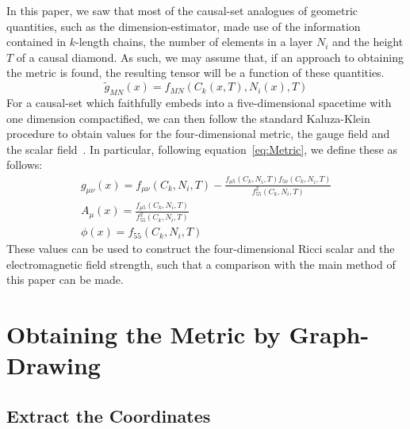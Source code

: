 \documentclass[a4paper,12pt]{article}
\numberwithin{equation}{section}
\begin{document}
In this paper, we saw that most of the causal-set analogues of geometric quantities, such as the dimension-estimator, made use of the information contained in $k$-length chains, the number of elements in a layer $N_i$ and the height $T$ of a causal diamond. As such, we may assume that, if an approach to obtaining the metric is found, the resulting tensor will be a function of these quantities.
\begin{equation}
\label{eq:Metric as a function}
\tilde{g}_{MN}(x)=f_{MN}(C_k(x, T), N_i(x), T)
\end{equation}
For a causal-set which faithfully embeds into a five-dimensional spacetime with one dimension compactified, we can then follow the standard Kaluza-Klein procedure to obtain values for the four-dimensional metric, the gauge field and the scalar field~\cite{Bailin1987}. In particular, following equation~\ref{eq:Metric}, we define these as follows:
\begin{subequations}
\label{eq:Indirect Kaluza-Klein}
\begin{gather}
g_{\mu\nu}(x)=f_{\mu\nu}(C_k, N_i, T)-\frac{f_{\mu 5}(C_k, N_i, T)f_{5 \nu}(C_k, N_i, T)}{f_{55}^2(C_k, N_i, T)} \\
A_\mu(x)=\frac{f_{\mu 5}(C_k, N_i, T)}{f_{55}^2(C_k, N_i, T)} \\
\phi(x)=f_{55}(C_k, N_i, T)
\end{gather}
\end{subequations}
These values can be used to construct the four-dimensional Ricci scalar and the electromagnetic field strength, such that a comparison with the main method of this paper can be made.


\section{Obtaining the Metric by Graph-Drawing}
\label{sec:Obtaining the Metric by Graph-Drawing}
\subsection{Extract the Coordinates}
\label{sec:Extract the Coordinates}
\end{document}
